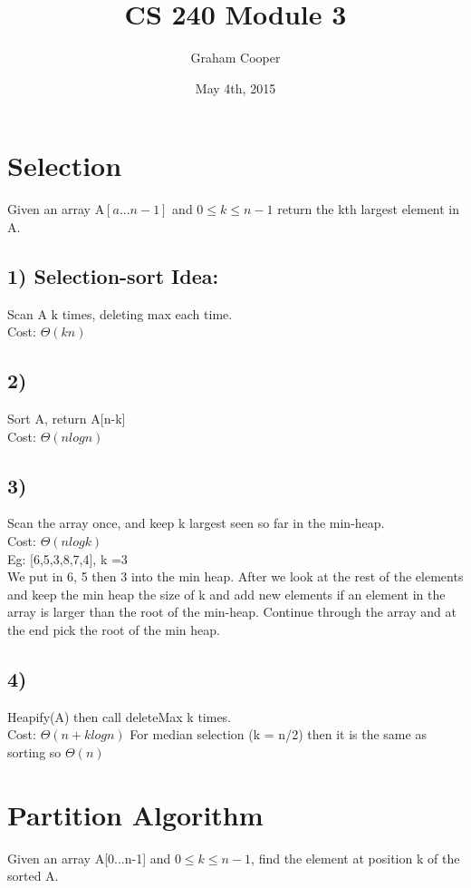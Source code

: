 \documentclass[12pt]{article}
\title{\vspace{-15ex}CS 240 Module 3\vspace{-1ex}}
\date{May 4th, 2015}
\author{Graham Cooper}
\begin{document}
	\maketitle
	
	\section*{Selection}
	Given an array A$[a...n-1]$ and $0 \leq k \leq n-1$ return the kth largest element in A.\\
	
	\subsection*{1) Selection-sort Idea:}
	Scan A k times, deleting max each time.\\
	Cost: $\Theta(kn)$\\
	\subsection{2)}
	Sort A, return A[n-k]\\
	Cost: $\Theta(nlogn)$\\
	
	\subsection*{3)}
	Scan the array once, and keep k largest seen so far in the min-heap.\\
	Cost: $\Theta(nlogk)$\\
	Eg: [6,5,3,8,7,4], k =3\\
	We put in 6, 5 then 3 into the min heap. After we look at the rest of the elements and keep the min heap the size of k and add new elements if an element in the array is larger than the root of the min-heap. Continue through the array and at the end pick the root of the min heap.
	
	\subsection*{4)}
	Heapify(A) then call deleteMax k times.\\
	Cost: $\Theta(n + klogn)$ For median selection (k = n/2) then it is the same as sorting so $\Theta(n)$\\
	
	
	
	\section*{Partition Algorithm}
	Given an array A[0...n-1] and $0 \leq k \leq n-1$, find the element at position k of the sorted A.\\
	
\end{document}

